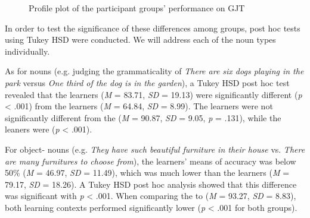 \documentclass[output=paper]{langsci/langscibook}
\begin{document}
\begin{figure} 

\caption{\label{fig:thomas:3} Profile plot of the participant groups’ performance on GJT}
\end{figure}


In order to test the significance of these differences among groups, post hoc tests using Tukey HSD were conducted. We will address each of the noun types individually. 

As for  nouns (e.g. judging the grammaticality of \textit{There are six dogs playing in the park} versus \textit{One third of the dog is in the garden}), a Tukey HSD post hoc test revealed that the  learners (\textit{M} = 83.71, \textit{SD} = 19.13) were significantly different (\textit{p} < .001) from the  learners (\textit{M} = 64.84, \textit{SD} = 8.99). The  learners were not significantly different from the  (\textit{M} = 90.87, \textit{SD} = 9.05, \textit{p} = .131), while the  leaners were (\textit{p} < .001). 

For  object- nouns (e.g. \textit{They have such beautiful furniture in their house} vs. \textit{There are many furnitures to choose from}), the  learners' means of accuracy was below 50\% (\textit{M} = 46.97, \textit{SD} = 11.49), which was much lower than the  learners (\textit{M} = 79.17, \textit{SD} = 18.26). A Tukey HSD post hoc analysis showed that this difference  was significant with \textit{p} < .001. When comparing the  to  (\textit{M} = 93.27, \textit{SD} = 8.83), both learning contexts performed significantly lower (\textit{p} < .001 for both groups). 
\end{document}
